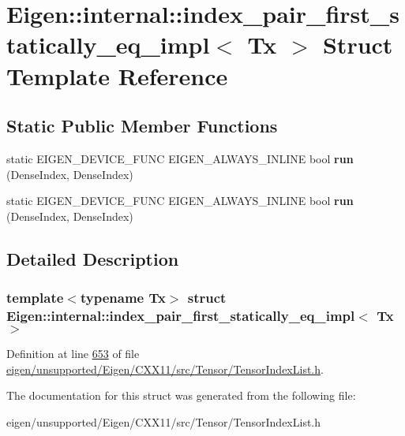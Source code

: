 \hypertarget{struct_eigen_1_1internal_1_1index__pair__first__statically__eq__impl}{}\section{Eigen\+:\+:internal\+:\+:index\+\_\+pair\+\_\+first\+\_\+statically\+\_\+eq\+\_\+impl$<$ Tx $>$ Struct Template Reference}
\label{struct_eigen_1_1internal_1_1index__pair__first__statically__eq__impl}
\subsection*{Static Public Member Functions}
\begin{DoxyCompactItemize}
\item 
\mbox{\label{struct_eigen_1_1internal_1_1index__pair__first__statically__eq__impl_a2fd89f92c28b72cbf0ed551bebffc012}} 
static E\+I\+G\+E\+N\+\_\+\+D\+E\+V\+I\+C\+E\+\_\+\+F\+U\+NC E\+I\+G\+E\+N\+\_\+\+A\+L\+W\+A\+Y\+S\+\_\+\+I\+N\+L\+I\+NE bool {\bfseries run} (Dense\+Index, Dense\+Index)
\item 
\mbox{\label{struct_eigen_1_1internal_1_1index__pair__first__statically__eq__impl_a2fd89f92c28b72cbf0ed551bebffc012}} 
static E\+I\+G\+E\+N\+\_\+\+D\+E\+V\+I\+C\+E\+\_\+\+F\+U\+NC E\+I\+G\+E\+N\+\_\+\+A\+L\+W\+A\+Y\+S\+\_\+\+I\+N\+L\+I\+NE bool {\bfseries run} (Dense\+Index, Dense\+Index)
\end{DoxyCompactItemize}


\subsection{Detailed Description}
\subsubsection*{template$<$typename Tx$>$\newline
struct Eigen\+::internal\+::index\+\_\+pair\+\_\+first\+\_\+statically\+\_\+eq\+\_\+impl$<$ Tx $>$}



Definition at line \hyperlink{eigen_2unsupported_2_eigen_2_c_x_x11_2src_2_tensor_2_tensor_index_list_8h_source_l00653}{653} of file \hyperlink{eigen_2unsupported_2_eigen_2_c_x_x11_2src_2_tensor_2_tensor_index_list_8h_source}{eigen/unsupported/\+Eigen/\+C\+X\+X11/src/\+Tensor/\+Tensor\+Index\+List.\+h}.



The documentation for this struct was generated from the following file\+:\begin{DoxyCompactItemize}
\item 
eigen/unsupported/\+Eigen/\+C\+X\+X11/src/\+Tensor/\+Tensor\+Index\+List.\+h\end{DoxyCompactItemize}
